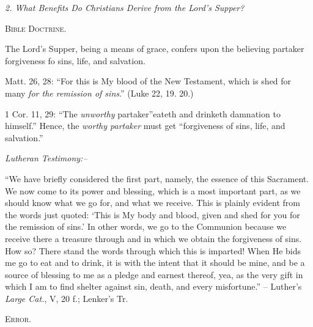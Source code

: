 \documentclass[
]{book}
\begin{document}
\begin{center}
\textsl{2.  What Benefits Do Christians Derive from the Lord's Supper?}

\textsc{Bible Doctrine.}
\end{center}

The Lord's Supper, being a means of grace, confers upon the believing partaker forgiveness fo sins, life, and salvation.

Matt. 26, 28: ``For this is My blood of the New Testament, which is shed for many \emph{for the remission of sins}.'' (Luke 22, 19. 20.)

1 Cor. 11, 29: ``The \emph{unworthy} partaker''eateth and drinketh damnation to himself.'' Hence, the \emph{worthy partaker} must get ``forgiveness of sins, life, and salvation.''

\begin{center}
\textsl{Lutheran Testimony:--}
\end{center}

``We have briefly considered the first part, namely, the essence of this Sacrament. We now come to its power and blessing, which is a most important part, as we should know what we go for, and what we receive. This is plainly evident from the words just quoted: `This is My body and blood, given and shed for you for the remission of sins.' In other words, we go to the Communion because we receive there a treasure through and in which we obtain the forgiveness of sins. How so? There stand the words through which this is imparted! When He bids me go to eat and to drink, it is with the intent that it should be mine, and be a source of blessing to me as a pledge and earnest thereof, yea, as the very gift in which I am to find shelter against sin, death, and every misfortune.'' -- Luther's \emph{Large Cat.}, V, 20 f.; Lenker's Tr.

\begin{center}
\textsc{Error.}
\end{center}
\end{document}
